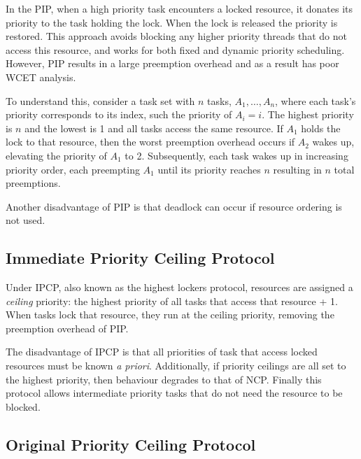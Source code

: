 In the \gls{PIP}, when a high priority task encounters a locked resource, it donates its priority 
to the task holding the lock. When the lock is released the priority is restored. 
This approach avoids blocking any higher priority threads that do not access this resource, and
works for both fixed and dynamic priority scheduling.
However, \gls{PIP} results in a large preemption overhead and as a result has poor WCET analysis.

To understand this, consider a task set with $n$ tasks, $A_{1}, \ldots, A_{n}$, where each task's priority
corresponds to its index, such the priority of $A_{i} = i$. The highest priority is $n$ and the
lowest is 1 and all tasks access the same resource. If $A_{1}$ holds the lock to that resource, then
the worst preemption overhead occurs if $A_{2}$ wakes up, elevating the priority of $A_{1}$ to 2. Subsequently,
each task wakes up in increasing priority order, each preempting $A_{1}$ until its priority reaches
$n$ resulting in $n$ total preemptions. 

Another disadvantage of \gls{PIP} is that deadlock can occur if resource ordering is not used.


\subsection{Immediate Priority Ceiling Protocol}
\label{sec:hlp}
\label{sec:ipcp}

Under \gls{IPCP}, also known as the highest lockers protocol, resources are assigned a
\emph{ceiling} priority: the highest priority of all tasks that access that resource + 1.  When tasks
lock that resource, they run at the ceiling priority, removing the preemption overhead
of \gls{PIP}.

The disadvantage of \gls{IPCP} is that all priorities of task that access locked resources must be known \emph{a
priori}.  Additionally, if priority ceilings are all set to the highest priority, then behaviour
degrades to that of \gls{NCP}. Finally this protocol allows intermediate priority tasks that do not need
the resource to be blocked. 

\subsection{Original Priority Ceiling Protocol}

